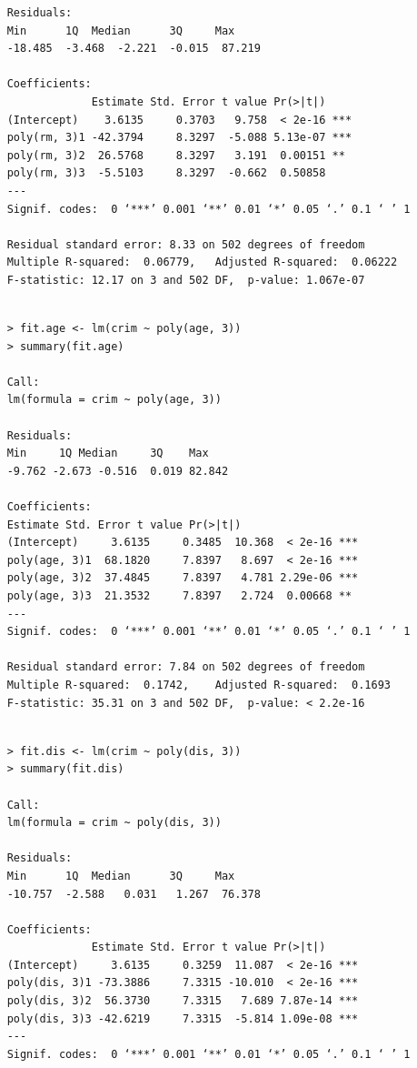 \documentclass{article}
\begin{document}
\begin{itemize}
\begin{program}
\begin{verbatim}
	Residuals:
	Min      1Q  Median      3Q     Max 
	-18.485  -3.468  -2.221  -0.015  87.219 
	
	Coefficients:
	             Estimate Std. Error t value Pr(>|t|)    
	(Intercept)    3.6135     0.3703   9.758  < 2e-16 ***
	poly(rm, 3)1 -42.3794     8.3297  -5.088 5.13e-07 ***
	poly(rm, 3)2  26.5768     8.3297   3.191  0.00151 ** 
	poly(rm, 3)3  -5.5103     8.3297  -0.662  0.50858    
	---
	Signif. codes:  0 ‘***’ 0.001 ‘**’ 0.01 ‘*’ 0.05 ‘.’ 0.1 ‘ ’ 1
	
	Residual standard error: 8.33 on 502 degrees of freedom
	Multiple R-squared:  0.06779,	Adjusted R-squared:  0.06222 
	F-statistic: 12.17 on 3 and 502 DF,  p-value: 1.067e-07
	
	\end{verbatim}
\end{program}


\begin{program}
	\begin{verbatim}
	> fit.age <- lm(crim ~ poly(age, 3))
	> summary(fit.age)
	
	Call:
	lm(formula = crim ~ poly(age, 3))
	
	Residuals:
	Min     1Q Median     3Q    Max 
	-9.762 -2.673 -0.516  0.019 82.842 
	
	Coefficients:
	Estimate Std. Error t value Pr(>|t|)    
	(Intercept)     3.6135     0.3485  10.368  < 2e-16 ***
	poly(age, 3)1  68.1820     7.8397   8.697  < 2e-16 ***
	poly(age, 3)2  37.4845     7.8397   4.781 2.29e-06 ***
	poly(age, 3)3  21.3532     7.8397   2.724  0.00668 ** 
	---
	Signif. codes:  0 ‘***’ 0.001 ‘**’ 0.01 ‘*’ 0.05 ‘.’ 0.1 ‘ ’ 1
	
	Residual standard error: 7.84 on 502 degrees of freedom
	Multiple R-squared:  0.1742,	Adjusted R-squared:  0.1693 
	F-statistic: 35.31 on 3 and 502 DF,  p-value: < 2.2e-16
	
	\end{verbatim}
\end{program}


\begin{program}
	\begin{verbatim}
	> fit.dis <- lm(crim ~ poly(dis, 3))
	> summary(fit.dis)
	
	Call:
	lm(formula = crim ~ poly(dis, 3))
	
	Residuals:
	Min      1Q  Median      3Q     Max 
	-10.757  -2.588   0.031   1.267  76.378 
	
	Coefficients:
	             Estimate Std. Error t value Pr(>|t|)    
	(Intercept)     3.6135     0.3259  11.087  < 2e-16 ***
	poly(dis, 3)1 -73.3886     7.3315 -10.010  < 2e-16 ***
	poly(dis, 3)2  56.3730     7.3315   7.689 7.87e-14 ***
	poly(dis, 3)3 -42.6219     7.3315  -5.814 1.09e-08 ***
	---
	Signif. codes:  0 ‘***’ 0.001 ‘**’ 0.01 ‘*’ 0.05 ‘.’ 0.1 ‘ ’ 1
	

\end{verbatim}
\end{program}
\end{itemize}
\end{document}

